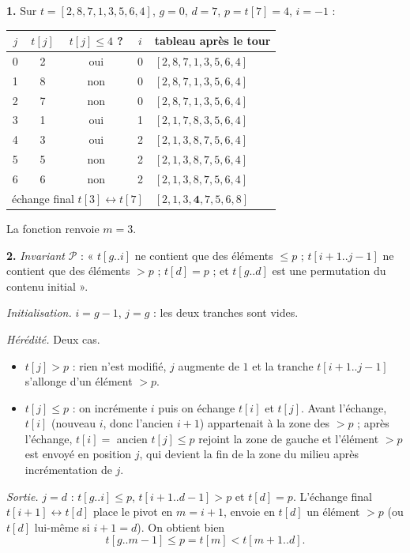 \documentclass[11pt,a4paper]{article}
\begin{document}
\reponse
\textbf{1.} Sur $t=[2,8,7,1,3,5,6,4]$, $g=0$, $d=7$, $p=t[7]=4$, $i=-1$ :
\begin{center}\small
\begin{tabular}{|c|c|c|c|l|}
\hline
$j$ & $t[j]$ & $t[j]\le4$ ? & $i$ & tableau après le tour\\\hline
0 & 2 & oui & 0 & $[2,8,7,1,3,5,6,4]$ \\
1 & 8 & non & 0 & $[2,8,7,1,3,5,6,4]$ \\
2 & 7 & non & 0 & $[2,8,7,1,3,5,6,4]$ \\
3 & 1 & oui & 1 & $[2,1,7,8,3,5,6,4]$ \\
4 & 3 & oui & 2 & $[2,1,3,8,7,5,6,4]$ \\
5 & 5 & non & 2 & $[2,1,3,8,7,5,6,4]$ \\
6 & 6 & non & 2 & $[2,1,3,8,7,5,6,4]$ \\\hline
\multicolumn{4}{|l|}{échange final $t[3]\leftrightarrow t[7]$} & $[2,1,3,\mathbf4,7,5,6,8]$ \\\hline
\end{tabular}
\end{center}
La fonction renvoie $m=3$.

\textbf{2.} \emph{Invariant} $\mathcal P$ : « $t[g..i]$ ne contient que des éléments
$\le p$ ; $t[i+1..j-1]$ ne contient que des éléments $>p$ ; $t[d]=p$ ; et $t[g..d]$ est
une permutation du contenu initial ».

\emph{Initialisation.} $i=g-1$, $j=g$ : les deux tranches sont vides. \checkmark

\emph{Hérédité.} Deux cas.
\begin{itemize}[leftmargin=*,itemsep=1pt]
  \item $t[j]>p$ : rien n'est modifié, $j$ augmente de $1$ et la tranche
        $t[i+1..j-1]$ s'allonge d'un élément $>p$. \checkmark
  \item $t[j]\le p$ : on incrémente $i$ puis on échange $t[i]$ et $t[j]$.
        Avant l'échange, $t[i]$ (nouveau $i$, donc l'ancien $i+1$) appartenait à la zone
        des $>p$ ; après l'échange, $t[i]=$ ancien $t[j]\le p$ rejoint la zone de gauche
        et l'élément $>p$ est envoyé en position $j$, qui devient la fin de la zone du
        milieu après incrémentation de $j$. \checkmark
\end{itemize}

\emph{Sortie.} $j=d$ : $t[g..i]\le p$, $t[i+1..d-1]>p$ et $t[d]=p$. L'échange final
$t[i+1]\leftrightarrow t[d]$ place le pivot en $m=i+1$, envoie en $t[d]$ un élément
$>p$ (ou $t[d]$ lui-même si $i+1=d$). On obtient bien
\[
  t[g..m-1]\le p=t[m]<t[m+1..d].
\]
\end{document}
